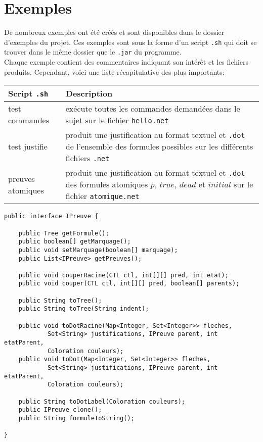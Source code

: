 \documentclass[dvipsnames]{report}
\begin{document}
\section{Exemples}

De nombreux exemples ont été créés et sont disponibles dans le dossier d'exemples du projet. Ces exemples sont sous la forme d'un script \texttt{.sh} qui doit se trouver dans le même dossier que le \texttt{.jar} du programme.\\

Chaque exemple contient des commentaires indiquant son intérêt et les fichiers produits. Cependant, voici une liste récapitulative des plus importants:\\

\noindent\begin{tabularx}{\linewidth}{| @{}l | X@{} |}
\hline
Script \texttt{.sh} & Description \\
\hline
test commandes & exécute toutes les commandes demandées dans le sujet sur le fichier \texttt{hello.net} \\
\hline
test justifie & produit une justification au format textuel et \texttt{.dot} de l'ensemble des formules possibles sur les différents fichiers \texttt{.net} \\
\hline
preuves atomiques & produit une justification au format textuel et \texttt{.dot} des formules atomiques $p$, $true$, $dead$ et $initial$ sur le fichier \texttt{atomique.net} \\
\hline
\end{tabularx}

\newpage

\begin{lstlisting}[caption={Interface \psverb+IPreuve+ commune à toutes les preuves}, label={lst:IPreuve}]
public interface IPreuve {

	public Tree getFormule();
	public boolean[] getMarquage();
	public void setMarquage(boolean[] marquage);
	public List<IPreuve> getPreuves();

	public void couperRacine(CTL ctl, int[][] pred, int etat);
	public void couper(CTL ctl, int[][] pred, boolean[] parents);

	public String toTree();
	public String toTree(String indent);

	public void toDotRacine(Map<Integer, Set<Integer>> fleches,
			Set<String> justifications, IPreuve parent, int etatParent,
			Coloration couleurs);
	public void toDot(Map<Integer, Set<Integer>> fleches,
			Set<String> justifications, IPreuve parent, int etatParent,
			Coloration couleurs);

	public String toDotLabel(Coloration couleurs);
	public IPreuve clone();
	public String formuleToString();

}
\end{lstlisting}
\end{document}
